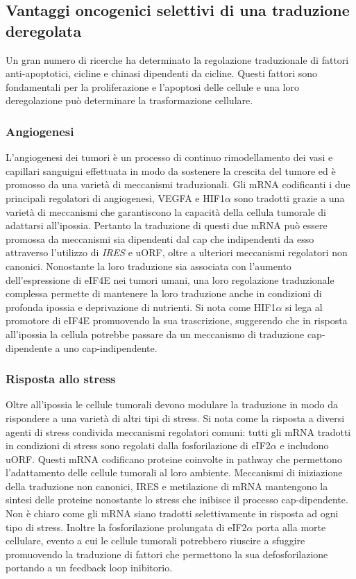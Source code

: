 	\subsection{Vantaggi oncogenici selettivi di una traduzione deregolata}
	Un gran numero di ricerche ha determinato la regolazione traduzionale di fattori anti-apoptotici, cicline e chinasi dipendenti da cicline.
	Questi fattori sono fondamentali per la proliferazione e l'apoptosi delle cellule e una loro deregolazione pu\`o determinare la trasformazione cellulare.

		\subsubsection{Angiogenesi}
		L'angiogenesi dei tumori \`e un processo di continuo rimodellamento dei vasi e capillari sanguigni effettuata in modo da sostenere la crescita del tumore ed \`e promosso da una variet\`a di meccanismi traduzionali.
		Gli mRNA codificanti i due principali regolatori di angiogenesi, VEGFA e HIF1$\alpha$ sono tradotti grazie a una variet\`a di meccanismi che garantiscono la capacit\`a della cellula tumorale di adattarsi all'ipossia.
		Pertanto la traduzione di questi due mRNA pu\`o essere promossa da meccanismi sia dipendenti dal cap che indipendenti da esso attraverso l'utilizzo di \emph{IRES} e uORF, oltre a ulteriori meccanismi regolatori non canonici.
		Nonostante la loro traduzione sia associata con l'aumento dell'espressione di eIF4E nei tumori umani, una loro regolazione traduzionale complessa permette di mantenere la loro traduzione anche in condizioni di profonda ipossia e deprivazione di nutrienti.
		Si nota come HIF1$\alpha$ si lega al promotore di eIF4E promuovendo la sua trascrizione, suggerendo che in risposta all'ipossia la cellula potrebbe passare da un meccanismo di traduzione cap-dipendente a uno cap-indipendente.

		\subsubsection{Risposta allo stress}
		Oltre all'ipossia le cellule tumorali devono modulare la traduzione in modo da rispondere a una variet\`a di altri tipi di stress.
		Si nota come la risposta a diversi agenti di stress condivida meccanismi regolatori comuni: tutti gli mRNA tradotti in condizioni di stress sono regolati dalla fosforilazione di eIF2$\alpha$ e includono uORF.
		Questi mRNA codificano proteine coinvolte in pathway che permettono l'adattamento delle cellule tumorali al loro ambiente.
		Meccanismi di iniziazione della traduzione non canonici, IRES e metilazione di mRNA mantengono la sintesi delle proteine nonostante lo stress che inibisce il processo cap-dipendente.
		Non \`e chiaro come gli mRNA siano tradotti selettivamente in risposta ad ogni tipo di stress.
		Inoltre la fosforilazione prolungata di eIF2$\alpha$ porta alla morte cellulare, evento a cui le cellule tumorali potrebbero riuscire a sfuggire promuovendo la traduzione di fattori che permettono la sua defosforilazione portando a un feedback loop inibitorio.

